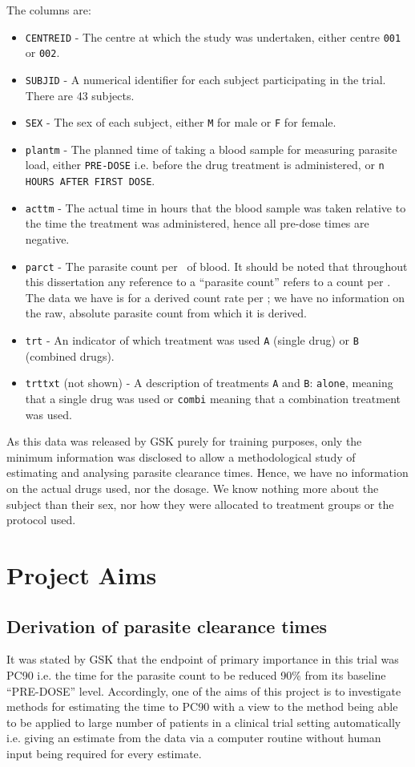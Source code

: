 The columns are:
\begin{itemize}
\item\texttt{CENTREID} - The centre at which the study was undertaken, either centre \texttt{001} or \texttt{002}.
\item\texttt{SUBJID} - A numerical identifier for each subject participating in the trial. There are 43 subjects.
\item\texttt{SEX} - The sex of each subject, either \texttt{M} for male or \texttt{F} for female.
\item\texttt{plantm} - The planned time of taking a blood sample for measuring parasite load, either \texttt{PRE-DOSE} i.e. before the drug treatment is administered, or \texttt{n HOURS AFTER FIRST DOSE}.
\item\texttt{acttm} - The actual time in hours that the blood sample was taken relative to the time the treatment was administered, hence all pre-dose times are negative.
\item\texttt{parct} - The parasite count per \micro\liter\ of blood. It should be noted that throughout this dissertation any reference to a ``parasite count'' refers to a count per \micro\liter. The data we have is for a derived count rate per \micro\liter; we have no information on the raw, absolute parasite count from which it is derived.
\item\texttt{trt} - An indicator of which treatment was used \texttt{A} (single drug) or \texttt{B} (combined drugs).
\item\texttt{trttxt} (not shown) - A description of treatments \texttt{A} and \texttt{B}: \texttt{alone}, meaning that a single drug was used or \texttt{combi} meaning that a combination treatment was used.
\end{itemize}

As this data was released by GSK purely for training purposes, only the minimum information was disclosed to allow a methodological study of estimating and analysing parasite clearance times. Hence, we have no information on the actual drugs used, nor the dosage. We know nothing more about the subject than their sex, nor how they were allocated to treatment groups or the protocol used.

\section{Project Aims}
\subsection{Derivation of parasite clearance times}
It was stated by GSK that the endpoint of primary importance in this trial was PC90 i.e. the time for the parasite count to be reduced 90\% from its baseline ``PRE-DOSE'' level. Accordingly, one of the aims of this project is to investigate methods for estimating the time to PC90 with a view to the method being able to be applied to large number of patients in a clinical trial setting automatically i.e. giving an estimate from the data via a computer routine without human input being required for every estimate.

